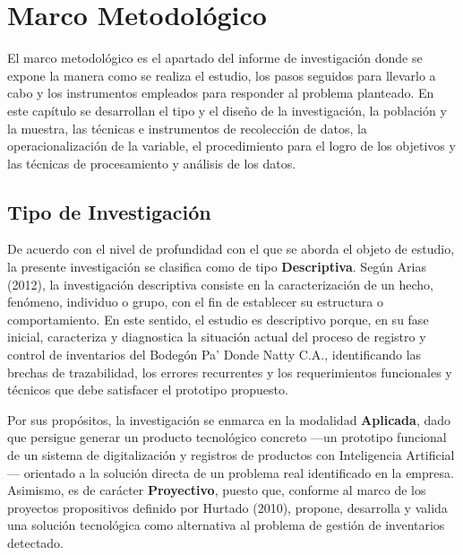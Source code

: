 \documentclass[12pt, letterpaper]{report}
\begin{document}
\chapter{Marco Metodológico}

El marco metodológico es el apartado del informe de investigación donde
se expone la manera como se realiza el estudio, los pasos seguidos para
llevarlo a cabo y los instrumentos empleados para responder al problema
planteado. En este capítulo se desarrollan el tipo y el diseño de la
investigación, la población y la muestra, las técnicas e instrumentos de
recolección de datos, la operacionalización de la variable, el
procedimiento para el logro de los objetivos y las técnicas de
procesamiento y análisis de los datos.

\section{Tipo de Investigación}

De acuerdo con el nivel de profundidad con el que se aborda el objeto de
estudio, la presente investigación se clasifica como de tipo
\textbf{Descriptiva}. Según Arias (2012), la investigación descriptiva
consiste en la caracterización de un hecho, fenómeno, individuo o grupo,
con el fin de establecer su estructura o comportamiento. En este sentido,
el estudio es descriptivo porque, en su fase inicial, caracteriza y
diagnostica la situación actual del proceso de registro y control de
inventarios del Bodegón Pa' Donde Natty C.A., identificando las brechas
de trazabilidad, los errores recurrentes y los requerimientos
funcionales y técnicos que debe satisfacer el prototipo propuesto.

Por sus propósitos, la investigación se enmarca en la modalidad
\textbf{Aplicada}, dado que persigue generar un producto tecnológico
concreto ---un prototipo funcional de un sistema de digitalización y
registros de productos con Inteligencia Artificial--- orientado a la
solución directa de un problema real identificado en la empresa.
Asimismo, es de carácter \textbf{Proyectivo}, puesto que, conforme al
marco de los proyectos propositivos definido por Hurtado (2010),
propone, desarrolla y valida una solución tecnológica como alternativa
al problema de gestión de inventarios detectado.
\end{document}
